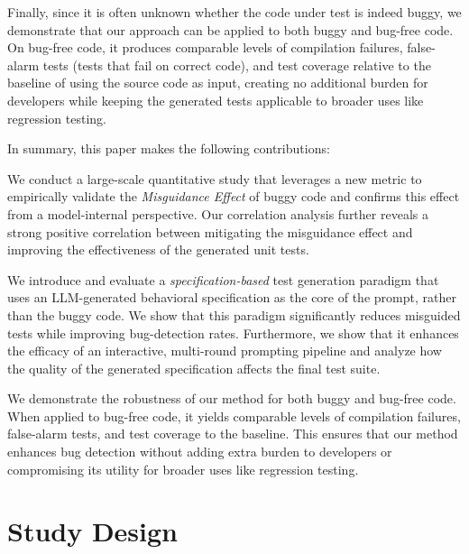 \documentclass[acmsmall]{acmart}
\begin{document}
Finally, since it is often unknown whether the code under test is indeed buggy, we demonstrate that our approach can be applied to both buggy and bug-free code. On bug-free code, it produces comparable levels of compilation failures, false-alarm tests (tests that fail on correct code), and test coverage relative to the baseline of using the source code as input, creating no additional burden for developers while keeping the generated tests applicable to broader uses like regression testing.

In summary, this paper makes the following contributions:

\newcommand{\myitem}[1]{%
\par\noindent
\hangindent=10pt
#1\par
}

\myitem{We conduct a large-scale quantitative study that leverages a new metric to empirically validate the \emph{Misguidance Effect} of buggy code and confirms this effect from a model-internal perspective. Our correlation analysis further reveals a strong positive correlation between mitigating the misguidance effect and improving the effectiveness of the generated unit tests.}

\myitem{We introduce and evaluate a \emph{specification-based} test generation paradigm that uses an LLM-generated behavioral specification as the core of the prompt, rather than the buggy code. We show that this paradigm significantly reduces misguided tests while improving bug-detection rates. Furthermore, we show that it enhances the efficacy of an interactive, multi-round prompting pipeline and analyze how the quality of the generated specification affects the final test suite.}

\myitem{We demonstrate the robustness of our method for both buggy and bug-free code. When applied to bug-free code, it yields comparable levels of compilation failures, false-alarm tests, and test coverage to the baseline. This ensures that our method enhances bug detection without adding extra burden to developers or compromising its utility for broader uses like regression testing.}

\section{Study Design}  
\end{document}

